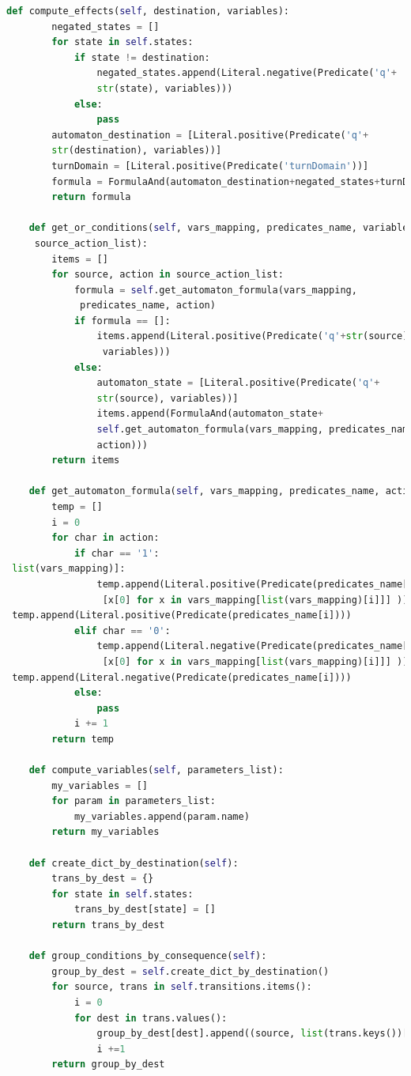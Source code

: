 \begin{lstlisting}[language=Python, style=Python, escapechar = £,  label={code:fond-automa}, caption={The \texttt{Automa} class.}]
    def compute_effects(self, destination, variables):
        negated_states = []
        for state in self.states:
            if state != destination:
                negated_states.append(Literal.negative(Predicate('q'+
                str(state), variables)))
            else:
                pass
        automaton_destination = [Literal.positive(Predicate('q'+
        str(destination), variables))]
        turnDomain = [Literal.positive(Predicate('turnDomain'))]
        formula = FormulaAnd(automaton_destination+negated_states+turnDomain)
        return formula

    def get_or_conditions(self, vars_mapping, predicates_name, variables,
     source_action_list):
        items = []
        for source, action in source_action_list:
            formula = self.get_automaton_formula(vars_mapping,
             predicates_name, action)
            if formula == []:
                items.append(Literal.positive(Predicate('q'+str(source),
                 variables)))
            else:
                automaton_state = [Literal.positive(Predicate('q'+
                str(source), variables))]
                items.append(FormulaAnd(automaton_state+
                self.get_automaton_formula(vars_mapping, predicates_name, 
                action)))
        return items

    def get_automaton_formula(self, vars_mapping, predicates_name, action):
        temp = []
        i = 0
        for char in action:
            if char == '1':
 list(vars_mapping)]:
                temp.append(Literal.positive(Predicate(predicates_name[i],
                 [x[0] for x in vars_mapping[list(vars_mapping)[i]]] )))
 temp.append(Literal.positive(Predicate(predicates_name[i])))
            elif char == '0':
                temp.append(Literal.negative(Predicate(predicates_name[i],
                 [x[0] for x in vars_mapping[list(vars_mapping)[i]]] )))
 temp.append(Literal.negative(Predicate(predicates_name[i])))
            else:
                pass
            i += 1
        return temp

    def compute_variables(self, parameters_list):
        my_variables = []
        for param in parameters_list:
            my_variables.append(param.name)
        return my_variables

    def create_dict_by_destination(self):
        trans_by_dest = {}
        for state in self.states:
            trans_by_dest[state] = []
        return trans_by_dest

    def group_conditions_by_consequence(self):
        group_by_dest = self.create_dict_by_destination()
        for source, trans in self.transitions.items():
            i = 0
            for dest in trans.values():
                group_by_dest[dest].append((source, list(trans.keys())[i]))
                i +=1
        return group_by_dest
\end{lstlisting}
